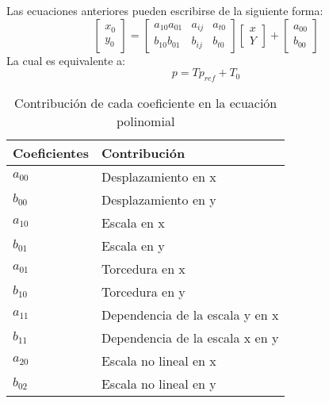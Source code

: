   Las ecuaciones anteriores pueden escribirse de la siguiente forma:
  \begin{equation}
    \begin{bmatrix}
        x_0\\ y_0
    \end{bmatrix} =\begin{bmatrix}
        a_{10}a_{01} &a_{ij}&a_{t0}  \\
        b_{10}b_{01}&b_{ij}&b_{t0}  
    \end{bmatrix}\begin{bmatrix}
         x \\
         Y  
    \end{bmatrix} +\begin{bmatrix}
        a_{00}\\ b_{00}
    \end{bmatrix}
\end{equation}
La cual es equivalente a:
\begin{equation}
    p = Tp_{ref} + T_0
\end{equation}
\begin{table}[h!]
  \centering \begin{tabular}{@{}ll@{}}
    \toprule
    Coeficientes & Contribución                    \\ \midrule
    $a_{00}$          & Desplazamiento en x             \\
    $b_{00}$          & Desplazamiento en y             \\
    $a_{10}$          & Escala en x                     \\
    $b_{01}$          & Escala en y                     \\
    $a_{01}$          & Torcedura en x                  \\
    $b_{10}$          & Torcedura en y                  \\
    $a_{11}$          & Dependencia de la escala y en x \\
    $b_{11}$          & Dependencia de la escala x en y \\
    $a_{20}$          & Escala no lineal en x           \\
    $b_{02}$          & Escala no lineal en y           \\ \bottomrule
    \end{tabular}
    \caption{Contribución de cada coeficiente en la ecuación polinomial}
    \label{tabt4}
    \end{table}

